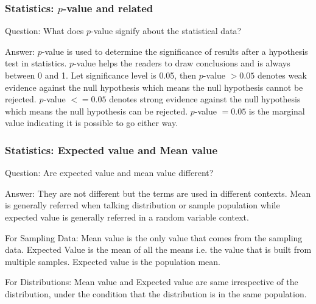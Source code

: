 \documentclass[11pt]{beamer}
\begin{document}
\begin{frame}
\frametitle{Statistics: $p$-value and related}
\begin{block}{Question:}
	What does $p$-value signify about the statistical data?
\end{block}
\begin{block}{Answer:}
	$p$-value is used to determine the significance of results after a hypothesis test in statistics. $p$-value helps the readers to draw conclusions and is always between 0 and 1. Let significance level is 0.05, then 
	$p$-value $> 0.05$ denotes weak evidence against the null hypothesis which means the null hypothesis cannot be rejected.
	$p$-value $<= 0.05$ denotes strong evidence against the null hypothesis which means the null hypothesis can be rejected.
	$p$-value $=0.05$ is the marginal value indicating it is possible to go either way.
\end{block}
\end{frame}



\begin{frame}
\frametitle{Statistics: Expected value and Mean value}
\begin{block}{Question:}
	Are expected value and mean value different?
\end{block}
\begin{block}{Answer:}
	They are not different but the terms are used in different contexts. Mean is generally referred when talking distribution or sample population while expected value is generally referred in a random variable context.
	
	For Sampling Data: Mean value is the only value that comes from the sampling data.
	Expected Value is the mean of all the means i.e. the value that is built from multiple samples. Expected value is the population mean.
	
	For Distributions: Mean value and Expected value are same irrespective of the distribution, under the condition that the distribution is in the same population.
\end{block}
\end{frame}
\end{document}
